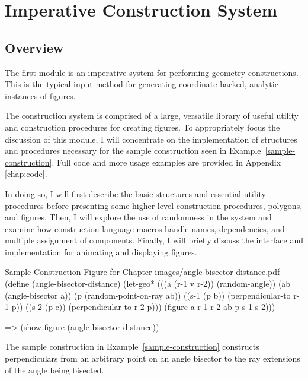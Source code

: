 \chapter{Imperative Construction System}
\label{chap:imperative}

\section{Overview}

The first module is an imperative system for performing geometry
constructions. This is the typical input method for generating
coordinate-backed, analytic instances of figures.

The construction system is comprised of a large, versatile library of
useful utility and construction procedures for creating figures. To
appropriately focus the discussion of this module, I will concentrate
on the implementation of structures and procedures necessary for the
sample construction seen in Example~\ref{sample-construction}.  Full
code and more usage examples are provided in Appendix \ref{chap:code}.

In doing so, I will first describe the basic structures and essential
utility procedures before presenting some higher-level construction
procedures, polygons, and figures. Then, I will explore the use of
randomness in the system and examine how construction language macros
handle names, dependencies, and multiple assignment of components.
Finally, I will briefly discuss the interface and implementation for
animating and displaying figures.

\begin{pdf-example}
[label=sample-construction]
{Sample Construction Figure for Chapter}
{images/angle-bisector-distance.pdf}
(define (angle-bisector-distance)
  (let-geo* (((a (r-1 v r-2)) (random-angle))
             (ab (angle-bisector a))
             (p (random-point-on-ray ab))
             ((s-1 (p b)) (perpendicular-to r-1 p))
             ((s-2 (p c)) (perpendicular-to r-2 p)))
     (figure a r-1 r-2 ab p s-1 s-2)))

=> (show-figure (angle-bisector-distance))
\end{pdf-example}

The sample construction in Example~\ref{sample-construction}
constructs perpendiculars from an arbitrary point on an angle bisector
to the ray extensions of the angle being bisected.



